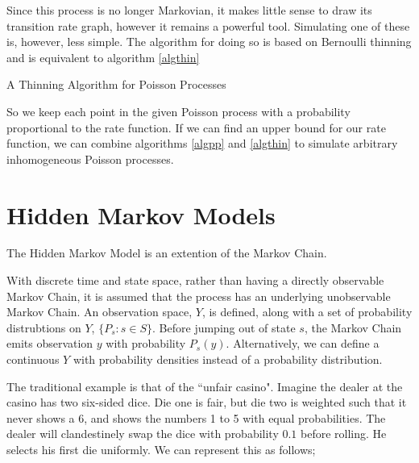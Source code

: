 Since this process is no longer Markovian, it makes little sense to draw its transition rate graph, however it remains a powerful tool. Simulating one of these is, however, less simple. The algorithm for doing so is based on Bernoulli thinning \cite{thinning} and is equivalent to algorithm \ref{algthin}

\begin{algorithm}
\SetAlgoLined
{}

\caption{A Thinning Algorithm for Poisson Processes}\label{algthin}

\end{algorithm}

So we keep each point in the given Poisson process with a probability proportional to the rate function. If we can find an upper bound for our rate function, we can combine algorithms \ref{algpp} and \ref{algthin} to simulate arbitrary inhomogeneous Poisson processes.

\section{Hidden Markov Models}

The Hidden Markov Model is an extention of the Markov Chain.

With discrete time and state space, rather than having a directly observable Markov Chain, it is assumed that the process has an underlying unobservable Markov Chain. An observation space, $Y$, is defined, along with a set of probability distrubtions on $Y$, $\{P_s : s \in S\}$. Before jumping out of state $s$, the Markov Chain emits observation $y$ with probability $P_s(y)$. Alternatively, we can define a continuous $Y$ with probability densities instead of a probability distribution.

The traditional example is that of the ``unfair casino". Imagine the dealer at the casino has two six-sided dice. Die one is fair, but die two is weighted such that it never shows a 6, and shows the numbers 1 to 5 with equal probabilities. The dealer will clandestinely swap the dice with probability $0.1$ before rolling. He selects his first die uniformly. We can represent this as follows;

